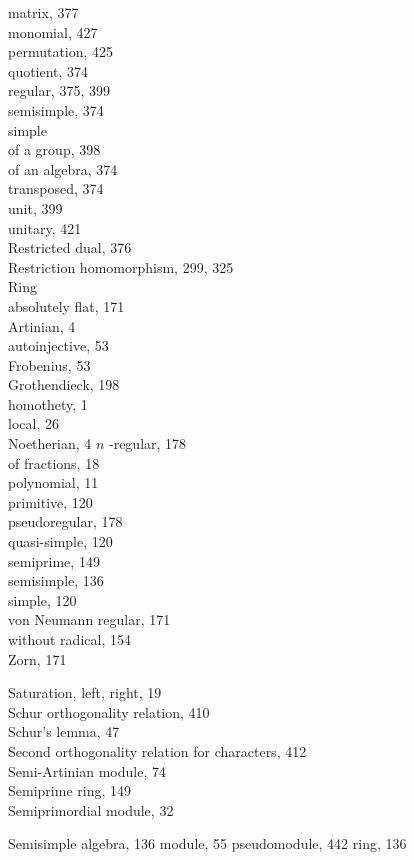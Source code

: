 matrix, 377\\
monomial, 427\\
permutation, 425\\
quotient, 374\\
regular, 375, 399\\
semisimple, 374\\
simple\\
of a group, 398\\
of an algebra, 374\\
transposed, 374\\
unit, 399\\
unitary, 421\\
Restricted dual, 376\\
Restriction homomorphism, 299, 325\\
Ring\\
absolutely flat, 171\\
Artinian, 4\\
autoinjective, 53\\
Frobenius, 53\\
Grothendieck, 198\\
homothety, 1\\
local, 26\\
Noetherian, 4 \(n\) -regular, 178\\
of fractions, 18\\
polynomial, 11\\
primitive, 120\\
pseudoregular, 178\\
quasi-simple, 120\\
semiprime, 149\\
semisimple, 136\\
simple, 120\\
von Neumann regular, 171\\
without radical, 154\\
Zorn, 171


Saturation, left, right, 19\\
Schur orthogonality relation, 410\\
Schur's lemma, 47\\
Second orthogonality relation for characters, 412\\
Semi-Artinian module, 74\\
Semiprime ring, 149\\
Semiprimordial module, 32

Semisimple algebra, 136 module, 55 pseudomodule, 442 ring, 136

